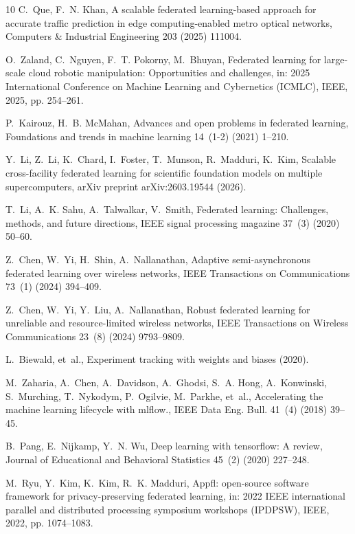 \documentclass[preprint,12pt, a4paper]{elsarticle}
\begin{document}
\begin{thebibliography}{10}
C.~Que, F.~N. Khan, A scalable federated learning-based approach for accurate traffic prediction in edge computing-enabled metro optical networks, Computers \& Industrial Engineering 203 (2025) 111004.

O.~Zaland, C.~Nguyen, F.~T. Pokorny, M.~Bhuyan, Federated learning for large-scale cloud robotic manipulation: Opportunities and challenges, in: 2025 International Conference on Machine Learning and Cybernetics (ICMLC), IEEE, 2025, pp. 254--261.

P.~Kairouz, H.~B. McMahan, Advances and open problems in federated learning, Foundations and trends in machine learning 14~(1-2) (2021) 1--210.

Y.~Li, Z.~Li, K.~Chard, I.~Foster, T.~Munson, R.~Madduri, K.~Kim, Scalable cross-facility federated learning for scientific foundation models on multiple supercomputers, arXiv preprint arXiv:2603.19544 (2026).

T.~Li, A.~K. Sahu, A.~Talwalkar, V.~Smith, Federated learning: Challenges, methods, and future directions, IEEE signal processing magazine 37~(3) (2020) 50--60.

Z.~Chen, W.~Yi, H.~Shin, A.~Nallanathan, Adaptive semi-asynchronous federated learning over wireless networks, IEEE Transactions on Communications 73~(1) (2024) 394--409.

Z.~Chen, W.~Yi, Y.~Liu, A.~Nallanathan, Robust federated learning for unreliable and resource-limited wireless networks, IEEE Transactions on Wireless Communications 23~(8) (2024) 9793--9809.

L.~Biewald, et~al., Experiment tracking with weights and biases (2020).

M.~Zaharia, A.~Chen, A.~Davidson, A.~Ghodsi, S.~A. Hong, A.~Konwinski, S.~Murching, T.~Nykodym, P.~Ogilvie, M.~Parkhe, et~al., Accelerating the machine learning lifecycle with mlflow., IEEE Data Eng. Bull. 41~(4) (2018) 39--45.

B.~Pang, E.~Nijkamp, Y.~N. Wu, Deep learning with tensorflow: A review, Journal of Educational and Behavioral Statistics 45~(2) (2020) 227--248.

M.~Ryu, Y.~Kim, K.~Kim, R.~K. Madduri, Appfl: open-source software framework for privacy-preserving federated learning, in: 2022 IEEE international parallel and distributed processing symposium workshops (IPDPSW), IEEE, 2022, pp. 1074--1083.


\end{thebibliography}
\end{document}
